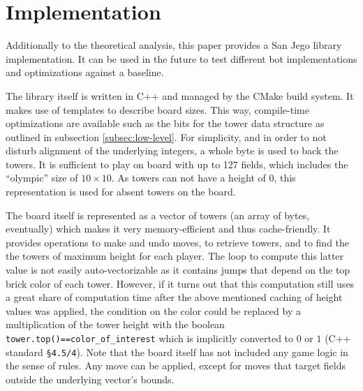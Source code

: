 \documentclass[sigconf]{acmart}
\begin{document}

\section{Implementation}
Additionally to the theoretical analysis, this paper provides a San Jego library implementation.
It can be used in the future to test different bot implementations and optimizations against a baseline.

The library itself is written in C++ and managed by the CMake build system.
It makes use of templates to describe board sizes.
This way, compile-time optimizations are available such as the bits for the tower data structure as outlined in subsection \ref{subsec:low-level}. 
For simplicity, and in order to not disturb alignment of the underlying integers, a whole byte is used to back the towers.
It is sufficient to play on board with up to 127 fields, which includes the \enquote{olympic} size of $10\times10$.
As towers can not have a height of 0, this representation is used for absent towers on the board.

The board itself is represented as a vector of towers (an array of bytes, eventually) which makes it very memory-efficient and thus cache-friendly.
It provides operations to make and undo moves, to retrieve towers, and to find the the towers of maximum height for each player.
The loop to compute this latter value is not easily auto-vectorizable as it contains jumps that depend on the top brick color of each tower.
However, if it turns out that this computation still uses a great share of computation time after the above mentioned caching of height values was applied, the condition on the color could be replaced by a multiplication of the tower height with the boolean \texttt{tower.top()==color\_of\_interest} which is implicitly converted to $0$ or $1$ (C++ standard \texttt{\S4.5/4}).
Note that the board itself has not included any game logic in the sense of rules.
Any move can be applied, except for moves that target fields outside the underlying vector's bounds.
\end{document}
